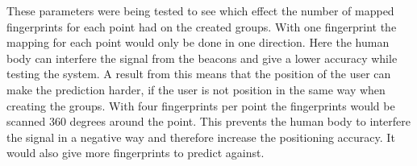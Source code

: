 These parameters were being tested to see which effect the number of mapped fingerprints for each point had on the created groups.
With one fingerprint the mapping for each point would only be done in one direction.
Here the human body can interfere the signal from the beacons and give a lower accuracy while testing the system.
A result from this means that the position of the user can make the prediction harder, if the user is not position in the same way when creating the groups.
With four fingerprints per point the fingerprints would be scanned 360 degrees around the point. 
This prevents the human body to interfere the signal in a negative way and therefore increase the positioning accuracy.
It would also give more fingerprints to predict against.
